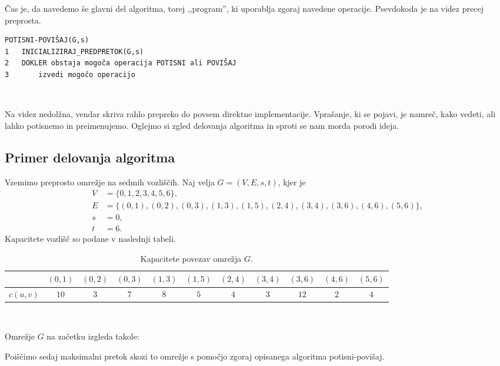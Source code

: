 \documentclass[mat1]{fmfdelo}
\begin{document}
Čas je, da navedemo še glavni del algoritma, torej ,,program'', ki uporablja zgoraj navedene operacije. Psevdokoda je na videz precej preprosta.\\

\begin{verbatim}
POTISNI-POVIŠAJ(G,s)
1   INICIALIZIRAJ_PREDPRETOK(G,s)
2   DOKLER obstaja mogoča operacija POTISNI ali POVIŠAJ
3       izvedi mogočo operacijo
\end{verbatim}~

Na videz nedolžna, vendar skriva rahlo prepreko do povsem direktne implementacije. Vprašanje, ki se pojavi, je namreč, kako vedeti, ali lahko potisnemo in preimenujemo. Oglejmo si zgled delovanja algoritma in sproti se nam morda porodi ideja.\\

\subsection{Primer delovanja algoritma}

Vzemimo preprosto omrežje na sedmih vozliščih. Naj velja $G = (V, E, s, t)$, kjer je
\begin{align*}
	V &= \{0,1,2,3,4,5,6\},\\
	E &= \{(0,1), (0,2), (0,3), (1,3), (1,5), (2,4), (3,4), (3,6), (4,6), (5,6)\},\\
	s &= 0,\\
	t &= 6.
\end{align*}
Kapacitete vozlišč so podane v naslednji tabeli.

\begin{table}[h!]
\centering
\caption{Kapacitete povezav omrežja $G$.}
\begin{tabular}{|l|c|c|c|c|c|c|c|c|c|c|}
\hline
& $(0,1)$ & $(0,2)$ & $(0,3)$ & $(1,3)$ & $(1,5)$ & $(2,4)$ & $(3,4)$ & $(3,6)$ & $(4,6)$ & $(5,6)$\\ \hline
$c(u,v)$ & $10$ & $3$ & $7$ & $8$ & $5$ & $4$ & $3$ & $12$ & $2$ & $4$\\
\hline
\end{tabular}
\end{table}~

Omrežje $G$ na začetku izgleda takole:


Poiščimo sedaj maksimalni pretok skozi to omrežje s pomočjo zgoraj opisanega algoritma potisni-povišaj.\\
\end{document}
